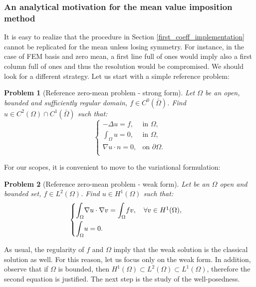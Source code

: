 \documentclass[a4paper,11pt]{article}
\newtheorem{problem}{Problem}
\begin{document}
\subsubsection{An analytical motivation for the mean value imposition method}
\noindent It is easy to realize that the procedure in Section \ref{first_coeff_implementation} cannot be replicated for the mean unless losing symmetry. For instance, in the case of FEM basis and zero mean, a first line full of ones would imply also a first column full of ones and thus the resolution would be compromised. We should look for a different strategy. Let us start with a simple reference problem: \\
\begin{problem}[Reference zero-mean problem - strong form] Let $\Omega$ be an open, bounded and sufficiently regular domain, $f\in C^0(\bar{\Omega})$. Find $u\in C^2(\Omega)\cap C^1(\bar{\Omega})$ such that:
\begin{equation*}
\begin{cases}
-\Delta{u}=f, & \text{in } \Omega,\\
\int_{\Omega} u = 0, & \text{in } \Omega, \\
\nabla u \cdot n = 0, & \text{on } \partial \Omega. \\
\end{cases}
\end{equation*}
\end{problem}\vspace{3mm}
\noindent For our scopes, it is convenient to move to the variational formulation:
\begin{problem}[Reference zero-mean problem - weak form]  \label{reference_problem} Let be an $\Omega$ open and bounded set, $f\in L^2(\Omega)$. Find $u\in H^1(\Omega)$ such that:
	\begin{equation*}
	\begin{cases}
	\mathlarger{\int}_{\Omega}\nabla u \cdot \nabla v = \mathlarger{\int}_{\Omega} fv, \quad \forall v \in H^1(\Omega),\\[2ex]
	\mathlarger{\int}_{\Omega}u = 0.
	\end{cases}
	\end{equation*}
\end{problem}
\noindent As usual, the regularity of $f$ and $\Omega$ imply that the weak solution is the classical solution as well. For this reason, let us focus only on the weak form. In addition, observe that if $\Omega$ is bounded, then $H^1(\Omega) \subset L^2(\Omega) \subset L^1(\Omega)$, therefore the second equation is justified. The next step is the study of the well-posedness.
\end{document}
